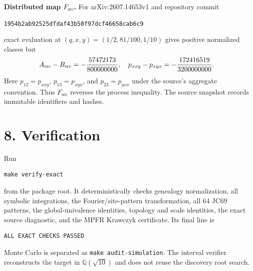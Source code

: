 \documentclass[10pt,twocolumn]{extarticle}
\newcommand{\Src}{F_{\mathrm{src}}}
\begin{document}
\textbf{Distributed map $\Src$.}  For arXiv:2607.14653v1 and repository commit
\begin{center}
\scriptsize\texttt{1954b2ab92525dfdaf43b50f97dcf46658cab6c9}
\end{center}
exact evaluation at $(q,x,y)=(1/2,81/100,1/10)$ gives positive normalized classes but
\[
A_{\rm src}-B_{\rm src}=-\frac{57472173}{800000000},
\quad
p_{xxy}-p_{xyx}=-\frac{172416519}{3200000000}.
\]
Here $p_{12}=p_{xxy}$, $p_{13}=p_{xyx}$, and $p_{23}=p_{yxx}$ under the source's aggregate convention.  Thus $\Src$ reverses the process inequality.  The source snapshot records immutable identifiers and hashes.

\section*{8. Verification}
Run
\begin{verbatim}
make verify-exact
\end{verbatim}
from the package root.  It deterministically checks genealogy normalization, all symbolic integrations, the Fourier/site-pattern transformation, all 64 JC69 patterns, the global-univalence identities, topology and scale identities, the exact source diagnostic, and the MPFR Krawczyk certificate.  Its final line is
\begin{verbatim}
ALL EXACT CHECKS PASSED
\end{verbatim}
Monte Carlo is separated as \texttt{make audit-simulation}.  The interval verifier reconstructs the target in $\mathbb Q(\sqrt{10})$ and does not reuse the discovery root search.
\end{document}
